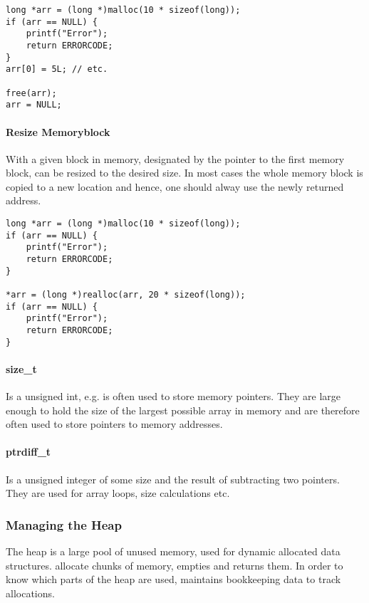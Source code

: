 \begin{lstlisting}
long *arr = (long *)malloc(10 * sizeof(long));
if (arr == NULL) {
    printf("Error");
    return ERRORCODE;
}
arr[0] = 5L; // etc.

free(arr);
arr = NULL;
\end{lstlisting}

\paragraph{Resize Memoryblock}
With  a given block in memory, designated by the pointer to the first memory block, can be resized to the desired size. In most cases the whole memory block is copied to a new location and hence, one should alway use the newly returned address.

\begin{lstlisting}
long *arr = (long *)malloc(10 * sizeof(long));
if (arr == NULL) {
    printf("Error");
    return ERRORCODE;
}

*arr = (long *)realloc(arr, 20 * sizeof(long));
if (arr == NULL) {
    printf("Error");
    return ERRORCODE;
}
\end{lstlisting}

\paragraph{size_t}
Is a unsigned int, e.g.  is often used to store memory pointers. They are large enough to hold the size of the largest possible array in memory and are therefore often used to store pointers to memory addresses.

\paragraph{ptrdiff_t}
Is a unsigned integer of some size and the result of subtracting two pointers. They are used for array loops, size calculations etc.

\subsubsection{Managing the Heap}
The heap is a large pool of unused memory, used for dynamic allocated data structures.  allocate chunks of memory,  empties and returns them. In order to know which parts of the heap are used,  maintains bookkeeping data to track allocations.

